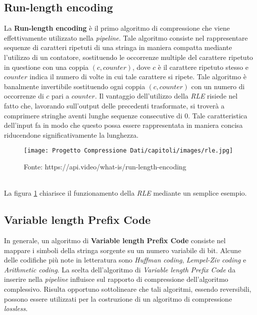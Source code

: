 \begin{enumerate}
\subsection{Run-length encoding} \label{section:rle}
La \textbf{Run-length encoding} è il primo algoritmo di compressione che viene effettivamente utilizzato nella \emph{pipeline}. Tale algoritmo consiste nel rappresentare sequenze di caratteri ripetuti di una stringa in maniera compatta mediante l'utilizzo di un contatore, sostituendo le occorrenze multiple del carattere ripetuto in questione con una coppia $(c, counter)$, dove $c$ è il carattere ripetuto stesso e $counter$ indica il numero di volte in cui tale carattere si ripete. Tale algoritmo è banalmente invertibile sostituendo ogni coppia $(c, counter)$ con un numero di occorrenze di $c$ pari a $counter$. Il vantaggio dell'utilizzo della \emph{RLE} risiede nel fatto che, lavorando sull'output delle precedenti trasformate, si troverà a comprimere stringhe aventi lunghe sequenze consecutive di $0$. Tale caratteristica dell'input fa in modo che questo possa essere rappresentata in maniera concisa riducendone significativamente la lunghezza.  
\begin{figure}[h]
    \centering
    \texttt{[image: Progetto Compressione Dati/capitoli/images/rle.jpg]}
\caption{Fonte: https://api.video/what-is/run-length-encoding}
    \label{fig:rle}
\end{figure} \\
La figura \ref{fig:rle} chiarisce il funzionamento della \emph{RLE} mediante un semplice esempio.
\subsection{Variable length Prefix Code} 
In generale, un algoritmo di \textbf{Variable length Prefix Code} consiste nel mappare i simboli della stringa sorgente su un numero variabile di bit. Alcune delle codifiche più note in letteratura sono \emph{Huffman coding}, \emph{Lempel-Ziv coding} e \emph{Arithmetic coding}. La scelta dell'algoritmo di \emph{Variable length Prefix Code} da inserire nella \emph{pipeline} influisce sul rapporto di compressione dell'algoritmo complessivo. Risulta opportuno sottolineare che tali algoritmi, essendo reversibili, possono essere utilizzati per la costruzione di un algoritmo di compressione \emph{lossless}.  

\end{enumerate}
